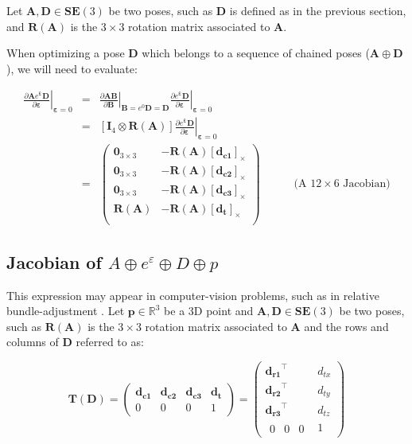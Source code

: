 \documentclass[a4paper,11pt]{report}
\newcommand{\E}{{\bm{\varepsilon}}}
\newcommand{\A}{{\mathbf{A}}}
\newcommand{\B}{{\mathbf{B}}}
\newcommand{\D}{{\mathbf{D}}}
\newcommand{\I}{{\mathbf{I}}}
\begin{document}
Let $\A,\D \in \mathbf{SE}(3)$ be two poses, such as 
$\D$ is defined as in the previous section, and $\mathbf{R}(\A)$ is 
the $3\times 3$ rotation matrix associated to $\A$.

When optimizing a pose $\D$ which belongs to a sequence of chained poses 
($\A \oplus \D$), we will need to evaluate:

\begin{eqnarray}
\left. \frac{\partial \A e^\E \D}{\partial \E} \right|_{\E = 0}
&=& 
\left. \frac{\partial \A \B}{\partial \B} \right|_{\B= e^0 \D = \D}
\left. \frac{\partial e^\E \mathbf{D}}{\partial \E} \right|_{\E = 0}
\\
&=&
\left[ \I_4 \otimes \mathbf{R}(\A) \right]
\left. \frac{\partial e^\E \mathbf{D}}{\partial \E} \right|_{\E = 0}
\\
&=&
\left(
\begin{array}{cc}
 \mathbf{0}_{3\times 3}  & -\mathbf{R}(\A) [\mathbf{d_{c1}}]_\times \\
 \mathbf{0}_{3\times 3}  & -\mathbf{R}(\A) [\mathbf{d_{c2}}]_\times \\
 \mathbf{0}_{3\times 3}  & -\mathbf{R}(\A) [\mathbf{d_{c3}}]_\times \\
 \mathbf{R}(\A)          & -\mathbf{R}(\A) [\mathbf{d_{t}}]_\times \\
\end{array}
\right)
\quad\quad\quad \text{(A $12 \times 6$ Jacobian)}
\end{eqnarray}


\subsection{Jacobian of $A \oplus e^\varepsilon \oplus D \oplus p$}

This expression may appear in computer-vision problems, 
such as in relative bundle-adjustment \cite{sibley2009rba}.
Let $\mathbf{p} \in \mathbb{R}^3$ be a 3D point
and $\A,\D \in \mathbf{SE}(3)$ be two poses, such as 
$\mathbf{R}(\A)$ is the $3\times 3$ rotation matrix associated to $\A$ and 
the rows and columns of $\D$ referred to as:

\begin{equation}
\mathbf{T}(\mathbf{D}) = 
\left(
\begin{array}{ccc|c}
 \mathbf{d_{c1}}  & \mathbf{d_{c2}}  & \mathbf{d_{c3}}  & \mathbf{d_{t}}  \\
\hline
  0 & 0 & 0 & 1
\end{array}
\right) 
=
\left(
\begin{array}{c|c}
    \mathbf{d_{r1}}^\top  & d_{tx}  \\ 
    \mathbf{d_{r2}}^\top  & d_{ty} \\ 
    \mathbf{d_{r3}}^\top  & d_{tz} \\
\hline
  \begin{array}{ccc}
    0  & 0  & 0 
  \end{array}
    & 1
\end{array}
\right) 
\end{equation}
\end{document}
